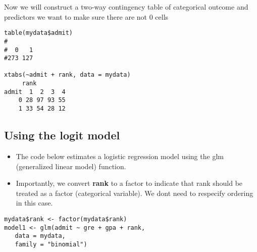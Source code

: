 \documentclass[]{article}
\begin{document}
\begin{framed}
Now we will construct a two-way contingency table of categorical outcome and predictors we want to make sure there are not 0 cells
\begin{verbatim}
table(mydata$admit)
#
#  0   1 
#273 127 

xtabs(~admit + rank, data = mydata)
     rank
admit  1  2  3  4
    0 28 97 93 55
    1 33 54 28 12
\end{verbatim}
\end{framed}
\newpage
\subsection{Using the logit model}
\begin{itemize}
\item The code below estimates a logistic regression model using the glm (generalized linear model) function. \item Importantly, we convert \textbf{rank} to a factor to indicate that rank should be treated as a factor (categorical variable). We dont need to respecify ordering in this case.
\end{itemize}

\begin{framed}
\begin{verbatim}
mydata$rank <- factor(mydata$rank)
model1 <- glm(admit ~ gre + gpa + rank, 
   data = mydata, 
   family = "binomial")
\end{verbatim}
\end{framed}
\newpage
\end{document}
